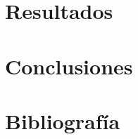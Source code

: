 \documentclass[12pt,a4paper,Spanish]{article}
\begin{document}
\newpage
\section{Resultados}







\newpage
\section{Conclusiones}








\newpage
\section{Bibliografía}
\printbibliography
\end{document}

